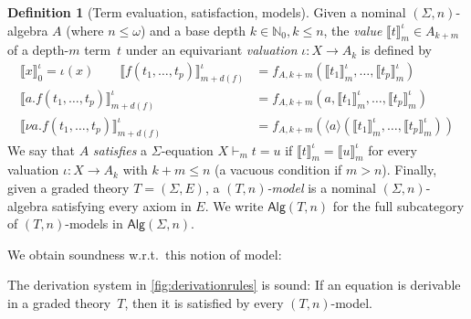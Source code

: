 \documentclass[a4paper,UKenglish,cleveref,thm-restate,numberwithinsect,final]{lipics-v2021}
\newcommand{\Alg}{\mathsf{Alg}}
\theoremstyle{plain}
\numberwithin{equation}{section}
\newcommand{\Nat}{{\mathbb{N}}}
\newcommand{\+}[1]{\mathcal{#1}\xspace}
\theoremstyle{definition}
\newtheorem{defn}[theorem]{Definition}
\begin{document}
\begin{defn}[Term evaluation, satisfaction, models]
  Given a nominal \((\Sigma, n)\)-algebra \(A\) (where $n\le\omega$)
  and a base depth \(k \in \Nat_0, k \le n\), the \emph{value}
  \(\llbracket t \rrbracket^\iota_m\in A_{k + m}\) of a depth-$m$
  term~$t$ under an equivariant \emph{valuation}
  \(\iota\colon X \to A_k\) is defined by
  \begin{align*}
    \llbracket x \rrbracket^\iota_0  = \iota(x) \qquad
    \llbracket f(t_1, \ldots, t_p) \rrbracket^\iota_{m + d(f)}  &= f_{A,
      k + m}(\llbracket t_1 \rrbracket^\iota_m, \ldots, \llbracket t_p
    \rrbracket^\iota_m)\\
    \llbracket a.f(t_1, \ldots, t_p) \rrbracket^\iota_{m + d(f)} &=
    f_{A, k + m}(a, \llbracket t_1 \rrbracket^\iota_m, \ldots,
    \llbracket t_p \rrbracket^\iota_m) \\
    \llbracket \nu a.f(t_1,
    \ldots, t_p) \rrbracket^\iota_{m + d(f)}  &= f_{A, k + m}(\langle a
    \rangle (\llbracket t_1 \rrbracket^\iota_m, \ldots, \llbracket t_p
    \rrbracket^\iota_m))
  \end{align*}
  We say that \(A\) \emph{satisfies} a $\Sigma$-equation
  \(X \vdash_m t = u\) if
  \(\llbracket t \rrbracket^\iota_m = \llbracket u
  \rrbracket^\iota_m\) for every valuation \(\iota\colon X \to A_k\)
  with \(k + m \le n\) (a vacuous condition if $m>n$). Finally, given
  a graded theory \(T = (\Sigma, E)\), a \emph{\((T, n)\)-model} is a
  nominal \((\Sigma, n)\)-algebra satisfying every axiom in \(E\).  We
  write \(\Alg(T, n)\) for the full subcategory of \((T, n)\)-models
  in \(\Alg(\Sigma, n)\).
\end{defn}
\noindent %



\noindent We obtain soundness w.r.t.~this notion of model:

\begin{theorem}[Soundness]\label{thm:soundness}
  The derivation system in \cref{fig:derivationrules} is sound: If
  an equation is derivable in a graded theory~$T$, then it is
  satisfied by every \((T, n)\)-model.
\end{theorem}

\end{document}
